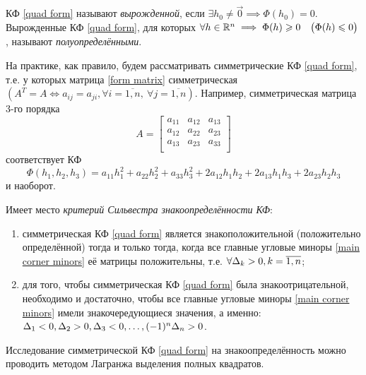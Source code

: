 \documentclass[../../main.tex]{subfiles}
\begin{document}
	КФ \eqref{quad form} называют \emph{вырожденной}, если
	$\exists h_0 \ne \vec{0} \implies \Phi(h_0) = 0$.
	Вырожденные КФ \eqref{quad form}, для которых
	$\forall h \in \mathbb{R}^n \implies \Phi(h) \geqslant 0
	\quad \big(\Phi(h) \leqslant 0\big)$,
	называют \emph{полуопределёнными}.
	
	На практике, как правило, будем рассматривать симметрические КФ
	\eqref{quad form}, т.е. у которых матрица \eqref{form matrix} симметрическая
	$\left(A^T = A \iff a_{i j} = a_{j i},
	\forall i = \overline{1, n},\ \forall j = \overline{1, n}\right)$.
	Например, симметрическая матрица 3-го порядка
	\[
		A =
		\begin{bmatrix}
			a_{1 1} & a_{1 2} & a_{1 3} \\
			a_{1 2} & a_{2 2} & a_{2 3} \\
			a_{1 3} & a_{2 3} & a_{3 3} \\
		\end{bmatrix}
	\]
	соответствует КФ
	\[
		\Phi(h_1, h_2, h_3)
		= a_{1 1} h_1^2 + a_{2 2} h_2^2 + a_{3 3} h_3^2
		+ 2 a_{1 2} h_1 h_2 + 2 a_{1 3} h_1 h_3 + 2 a_{2 3} h_2 h_3
	\]
	и наоборот.
	
	Имеет место \emph{критерий Сильвестра знакоопределённости КФ}:
	\begin{enumerate}
		\item
		симметрическая КФ \eqref{quad form} является знакоположительной
		(положительно определённой)
		тогда и только тогда, когда
		все главные угловые миноры \eqref{main corner minors} её матрицы
		положительны,
		т.е. $\forall \Delta_k > 0, k = \overline{1, n}$;
		
		\item
		для того, чтобы симметрическая КФ \eqref{quad form}
		была знакоотрицательной, необходимо и достаточно, чтобы все главные
		угловые миноры \eqref{main corner minors} имели знакочередующиеся
		значения, а именно: $\Delta_1 < 0, \Delta_2 > 0, \Delta_3 < 0,
		\ldots, (-1)^n \Delta_n > 0$.
	\end{enumerate}
	
	Исследование симметрической КФ \eqref{quad form} на знакоопределённость
	можно проводить методом Лагранжа выделения полных квадратов.
	
\end{document}
